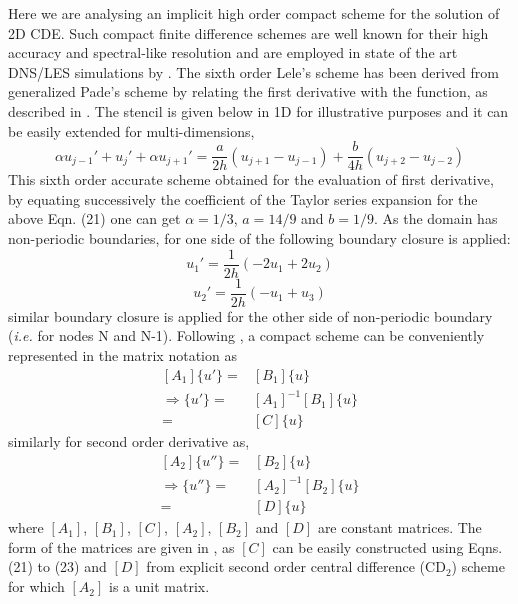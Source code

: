 \documentclass[showpacs,preprintnumbers,amsmath,amssymb]{revtex4-1} %
\begin{document}
Here we are analysing an implicit high order compact scheme for the solution of 2D CDE. Such compact finite difference schemes are well known for their high accuracy and spectral-like resolution and are employed in state of the art DNS/LES simulations by \cite{SENGUPTA_et_al_9, Sengupta_et_al_8}. The sixth order Lele's scheme \cite{LELE1992} has been derived from generalized Pade's scheme by relating the first derivative with the function, as described in \cite{sengupta2013high}. The stencil is given below in 1D for illustrative purposes and it can be easily extended for multi-dimensions,
\begin{equation}
\alpha u_{j-1}'+u_j'+\alpha u_{j+1}'=\frac{a}{2h} (u_{j+1}-u_{j-1})+\frac{b}{4h} (u_{j+2}-u_{j-2})
\end{equation}
This sixth order accurate scheme obtained for the evaluation of first derivative, by equating successively the coefficient of the Taylor series expansion for the above Eqn. (21) one can get $\alpha=1/3$, $a=14/9$ and $b=1/9$. As the domain has non-periodic boundaries, for one side of the following boundary closure is applied:
\begin{equation}
u_1'=\frac{1}{2h}(-2u_1+2u_2)
\end{equation}
\begin{equation}
u_2'=\frac{1}{2h}(-u_1+u_3)
\end{equation}
similar boundary closure is applied for the other side of non-periodic boundary (\textit{i.e.} for nodes N and N-1). Following \cite{SENGUPTA_Et_al_4}, a compact scheme can be conveniently represented in the matrix notation as
\begin{equation}
\begin{aligned}
[A_1]\{u'\}=&[B_1]\{u\}\\
\Rightarrow\{u'\}=&[A_1]^{-1}[B_1]\{u\}\\
=&[C]\{u\}
\end{aligned}
\end{equation}
similarly for second order derivative as,
\begin{equation}
\begin{aligned}
[A_2]\{u''\}=&[B_2]\{u\}\\
\Rightarrow\{u''\}=&[A_2]^{-1}[B_2]\{u\}\\
=&[D]\{u\}
\end{aligned}
\end{equation}
where $[A_1]$, $[B_1]$, $[C]$, $[A_2]$, $[B_2]$ and $[D]$ are constant matrices. The form of the matrices are given in \cite{SENGUPTA_Et_al_4}, as $[C]$ can be easily constructed using Eqns. (21) to (23) and $[D]$ from explicit second order central difference (CD$_2$) scheme for which $[A_2]$ is a unit matrix.
\end{document}
